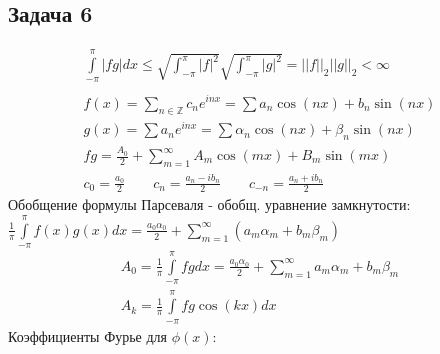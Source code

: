 \subsection*{Задача 6}
	\begin{gather*}
		\int\limits_{-\pi}^{\pi} |fg|dx
		\leqslant \sqrt{\int_{-\pi}^{\pi} |f|^2} \sqrt{\int_{-\pi}^{\pi} |g|^2}
		= ||f||_2||g||_2
		< \infty\\
		\\
		f(x) = \sum\limits_{n \in \mathbb{Z}} c_n e^{inx}
		= \sum a_n \cos(nx) + b_n \sin(nx)\\
		g(x) = \sum a_n e^{inx}
		= \sum \alpha_n \cos(nx) + \beta_n \sin(nx)\\
		fg = \frac{A_0}{2} + \sum\limits_{m = 1}^{\infty} A_m \cos(mx) + B_m \sin(mx)\\
		c_0 = \frac{a_0}{2}\qquad
		c_n = \frac{a_n - ib_n}{2}\qquad
		c_{-n} = \frac{a_n + ib_n}{2}
	\end{gather*}
	Обобщение формулы Парсеваля - обобщ. уравнение замкнутости: $\frac{1}{\pi}\int\limits_{-\pi}^{\pi} f(x)g(x)dx = \frac{a_0 \alpha_0}{2} + \sum\limits_{m = 1}^{\infty} (a_m \alpha_m + b_m \beta_m)$
	\begin{gather*}
		A_0 = \frac{1}{\pi} \int\limits_{-\pi}^{\pi} fg dx
		= \frac{a_0 \alpha_0}{2} + \sum\limits_{m=1}^{\infty} a_m \alpha_m + b_m \beta_m\\
		A_k = \frac{1}{\pi} \int\limits_{-\pi}^{\pi} fg \cos(kx) dx
	\end{gather*}
	Коэффициенты Фурье для $\phi(x):$
